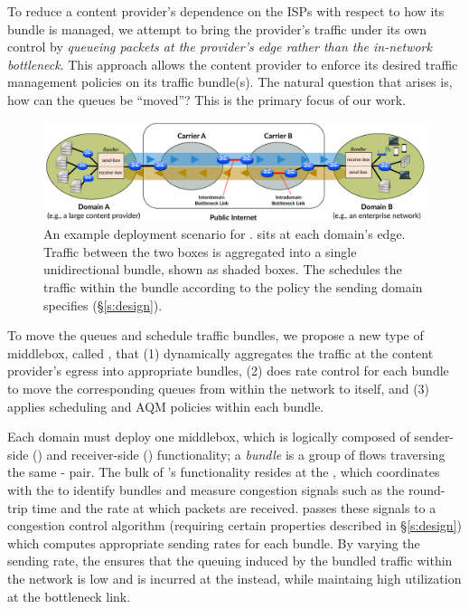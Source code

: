 To reduce a content provider's dependence on the ISPs with respect to how its bundle is managed, we attempt to bring the provider's traffic under its own control by \emph{queueing packets at the provider's edge rather than the in-network bottleneck}.
This approach allows the content provider to enforce its desired traffic management policies on its traffic bundle(s).
The natural question that arises is, how can the queues be ``moved''? This is the primary focus of our work. 

\begin{figure}[t]
    \centering
    \includegraphics[width=\textwidth]{img/deployment-arch.pdf}
    \caption{An example deployment scenario for \name. 
    \name sits at each domain's edge. Traffic between the two boxes is aggregated into a single unidirectional bundle, shown as shaded boxes. The \inbox schedules the traffic within the bundle according to the policy the sending domain specifies (\S\ref{s:design}).
    }\label{fig:deploy:arch}
\end{figure}

To move the queues and schedule traffic bundles, we propose a new type of middlebox, called \name, that (1) dynamically aggregates the traffic at the content provider's egress into appropriate bundles, (2) does rate control for each bundle to move the corresponding queues from within the network to itself, and (3) applies scheduling and AQM policies within each bundle. 

Each domain must deploy one middlebox, which is logically composed of sender-side (\inbox) and receiver-side (\outbox) functionality;
a \emph{bundle} is a group of flows traversing the same \inbox{}-\outbox{} pair.
The bulk of \name's functionality resides at the \inbox, which coordinates with the \outbox to identify bundles and measure congestion signals such as the round-trip time and the rate at which packets are received.
\inbox passes these signals to a congestion control algorithm (requiring certain properties described in \S\ref{s:design}) which computes appropriate sending rates for each bundle. 
By varying the sending rate, the \inbox ensures that the queuing induced by the bundled traffic within the network is low and is incurred at the \inbox instead, while maintaing high utilization at the bottleneck link.
 
